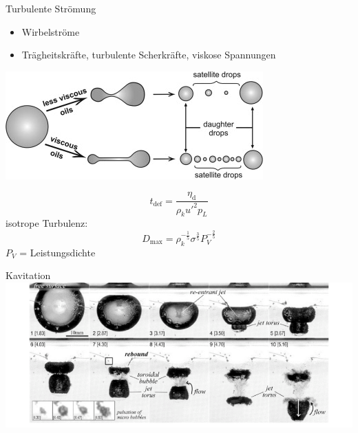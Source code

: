 \documentclass{beamer} %
\newcommand{\tx}[1]{\textrm{#1}}
\begin{document}
\begin{frame}{Turbulente Strömung}
	\begin{minipage}{0.4\linewidth}
		\begin{itemize}
			\item Wirbelströme
			\item Trägheitskräfte, turbulente Scherkräfte, viskose Spannungen
		\end{itemize}
	\end{minipage}%
	\begin{minipage}{0.6\linewidth}
		\includegraphics[width=\linewidth]{Markus/turbulentflowdrops}
	\end{minipage}
	\begin{equation*}
	t_{\tx{def}} = \frac{\eta_{\tx{d}}}{\rho_k u'^2 p_L}
	\end{equation*}
	isotrope Turbulenz:
	\begin{equation*}
	D_{\tx{max}} = \rho_k^{-\frac{1}{5}} \sigma^{\frac{3}{5}} P_V^{-\frac{2}{5}}
	\end{equation*}
	$ P_V $ = Leistungsdichte
\end{frame}

\begin{frame}{Kavitation}
	\includegraphics[width=\linewidth]{Markus/Cavitationbubble}
\end{frame}
\end{document}

